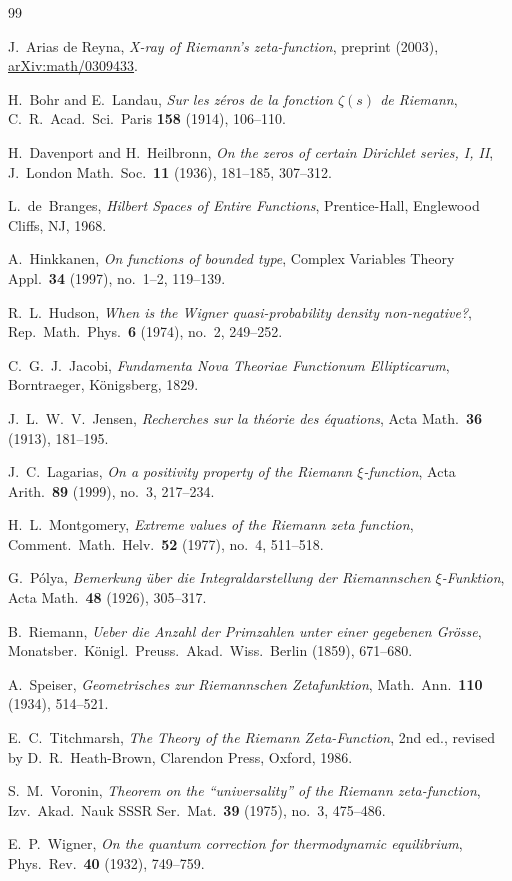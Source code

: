 \documentclass[11pt,reqno]{amsart}
\theoremstyle{plain}
\theoremstyle{definition}
\theoremstyle{remark}
\numberwithin{equation}{section}
\begin{document}
\begin{thebibliography}{99}

J.~Arias de Reyna, \emph{X-ray of Riemann's zeta-function}, preprint (2003), \href{https://arxiv.org/abs/math/0309433}{arXiv:math/0309433}.

H.~Bohr and E.~Landau, \emph{Sur les z\'eros de la fonction $\zeta(s)$ de Riemann}, C.\ R.\ Acad.\ Sci.\ Paris \textbf{158} (1914), 106--110.

H.~Davenport and H.~Heilbronn, \emph{On the zeros of certain Dirichlet series, I, II}, J.\ London Math.\ Soc.\ \textbf{11} (1936), 181--185, 307--312.

L.~de~Branges, \emph{Hilbert Spaces of Entire Functions}, Prentice-Hall, Englewood Cliffs, NJ, 1968.

A.~Hinkkanen, \emph{On functions of bounded type}, Complex Variables Theory Appl.\ \textbf{34} (1997), no.~1--2, 119--139.

R.~L.~Hudson, \emph{When is the Wigner quasi-probability density non-negative?}, Rep.\ Math.\ Phys.\ \textbf{6} (1974), no.~2, 249--252.

C.~G.~J.~Jacobi, \emph{Fundamenta Nova Theoriae Functionum Ellipticarum}, Borntraeger, K\"onigsberg, 1829.

J.~L.~W.~V.~Jensen, \emph{Recherches sur la th\'eorie des \'equations}, Acta Math.\ \textbf{36} (1913), 181--195.

J.~C.~Lagarias, \emph{On a positivity property of the Riemann $\xi$-function}, Acta Arith.\ \textbf{89} (1999), no.~3, 217--234.

H.~L.~Montgomery, \emph{Extreme values of the Riemann zeta function}, Comment.\ Math.\ Helv.\ \textbf{52} (1977), no.~4, 511--518.

G.~P\'olya, \emph{Bemerkung \"uber die Integraldarstellung der Riemannschen $\xi$-Funktion}, Acta Math.\ \textbf{48} (1926), 305--317.

B.~Riemann, \emph{Ueber die Anzahl der Primzahlen unter einer gegebenen Gr\"osse}, Monatsber.\ K\"onigl.\ Preuss.\ Akad.\ Wiss.\ Berlin (1859), 671--680.

A.~Speiser, \emph{Geometrisches zur Riemannschen Zetafunktion}, Math.\ Ann.\ \textbf{110} (1934), 514--521.

E.~C.~Titchmarsh, \emph{The Theory of the Riemann Zeta-Function}, 2nd ed., revised by D.~R.~Heath-Brown, Clarendon Press, Oxford, 1986.

S.~M.~Voronin, \emph{Theorem on the ``universality'' of the Riemann zeta-function}, Izv.\ Akad.\ Nauk SSSR Ser.\ Mat.\ \textbf{39} (1975), no.~3, 475--486.

E.~P.~Wigner, \emph{On the quantum correction for thermodynamic equilibrium}, Phys.\ Rev.\ \textbf{40} (1932), 749--759.

\end{thebibliography}
\end{document}
